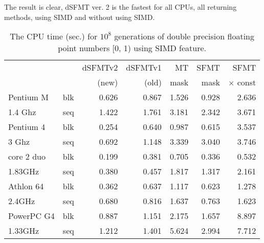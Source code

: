 \documentclass{svmult}
\begin{document}
The result is clear, dSFMT ver. 2 is the fastest for all CPUs, all
returning methods, using SIMD and without using SIMD.

\begin{table}
  \begin{center}
    \begin{tabular}{|ll|r|r|r|r|r|} \hline
      && dSFMTv2 & dSFMTv1 & MT & SFMT & SFMT \\
      && (new) & (old) & mask & mask & $\times$ const \\ \hline \hline
      Pentium M & blk & 0.626 & 0.867 & 1.526 & 0.928 & 2.636 \\
      1.4 Ghz & seq & 1.422 & 1.761 & 3.181 & 2.342 & 3.671 \\ \hline
      Pentium 4 & blk & 0.254 & 0.640 & 0.987 & 0.615 & 3.537 \\
      3 Ghz & seq & 0.692 & 1.148 & 3.339 & 3.040 & 3.746 \\ \hline
      core 2 duo & blk & 0.199 & 0.381 & 0.705 & 0.336 & 0.532 \\
      1.83GHz & seq & 0.380 & 0.457 & 1.817 & 1.317 & 2.161 \\\hline
      Athlon 64 & blk & 0.362 & 0.637 & 1.117 & 0.623 & 1.278 \\
      2.4GHz & seq & 0.680 & 0.816 & 1.637 & 0.763 & 1.623 \\ \hline
      PowerPC G4& blk & 0.887 & 1.151 & 2.175 & 1.657 & 8.897 \\
      1.33GHz & seq & 1.212 & 1.401 & 5.624 & 2.994 & 7.712 \\ \hline
    \end{tabular}
    \caption{The CPU time (sec.) for $10^8$ generations of double precision
      floating point numbers [0, 1) using SIMD feature.}
    \label{tab:speed-simd}
  \end{center}
\end{table}
\end{document}
